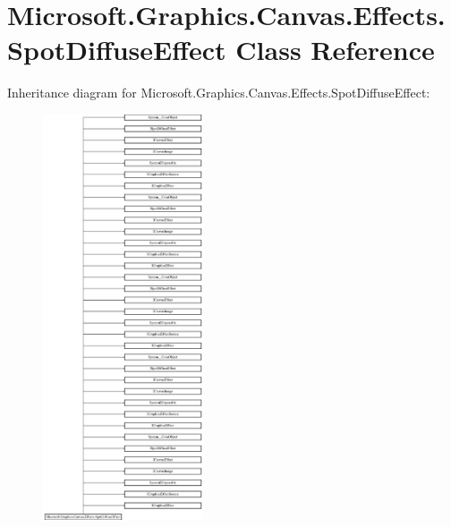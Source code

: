 \hypertarget{class_microsoft_1_1_graphics_1_1_canvas_1_1_effects_1_1_spot_diffuse_effect}{}\section{Microsoft.\+Graphics.\+Canvas.\+Effects.\+Spot\+Diffuse\+Effect Class Reference}
\label{class_microsoft_1_1_graphics_1_1_canvas_1_1_effects_1_1_spot_diffuse_effect}
Inheritance diagram for Microsoft.\+Graphics.\+Canvas.\+Effects.\+Spot\+Diffuse\+Effect\+:\begin{figure}[H]
\begin{center}
\leavevmode
\includegraphics[height=12.000000cm]{class_microsoft_1_1_graphics_1_1_canvas_1_1_effects_1_1_spot_diffuse_effect}
\end{center}
\end{figure}
